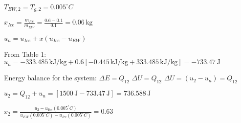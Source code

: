 \( T_{EW,2} = T_{g,2} = 0.005^\circ C \)  

\( x_{Ice} = \frac{m_{Ice}}{m_{EW}} = \frac{0.6 - 0.1}{0.1} = 0.06 \, \text{kg} \)  

\( u_n = u_{Ice} + x \left( u_{Ice} - u_{EW} \right) \)  

From Table 1:  
\( u_n = -333.485 \, \text{kJ/kg} + 0.6 \left[ -0.445 \, \text{kJ/kg} + 333.485 \, \text{kJ/kg} \right] = -733.47 \, \text{J} \)  

Energy balance for the system:  
\( \Delta E = Q_{12} \)  
\( \Delta U = Q_{12} \)  
\( \Delta U = (u_2 - u_n) = Q_{12} \)  

\( u_2 = Q_{12} + u_n = \left[ 1500 \, \text{J} - 733.47 \, \text{J} \right] = 736.588 \, \text{J} \)  

\( x_2 = \frac{u_2 - u_{Ice} (0.005^\circ C)}{u_{EW} (0.005^\circ C) - u_{Ice} (0.005^\circ C)} = 0.63 \)
